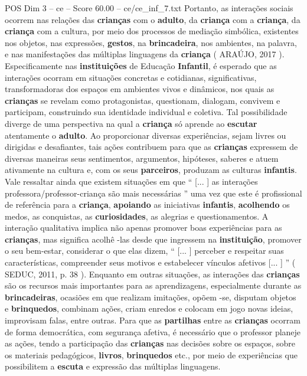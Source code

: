 \begin{textsample}{POS Dim 3 – ce – Score 60.00 – ce/ce\_inf\_7.txt}
Portanto, as interações sociais ocorrem nas relações das \textbf{crianças} com o \textbf{adulto}, da \textbf{criança} com a \textbf{criança}, da \textbf{criança} com a cultura, por meio dos processos de mediação simbólica, existentes nos objetos, nas expressões, \textbf{gestos}, na \textbf{brincadeira}, nos ambientes, na palavra, e nas manifestações das múltiplas linguagens da \textbf{criança} ( ARAÚJO, 2017 ).
Especificamente nas \textbf{instituições} de Educação \textbf{Infantil}, é esperado que as interações ocorram em situações concretas e cotidianas, significativas, transformadoras dos espaços em ambientes vivos e dinâmicos, nos quais as \textbf{crianças} se revelam como protagonistas, questionam, dialogam, convivem e participam, construindo sua identidade individual e coletiva.
Tal possibilidade diverge de uma perspectiva na qual a \textbf{criança} só aprende ao \textbf{escutar} atentamente o \textbf{adulto}.
Ao proporcionar diversas experiências, sejam livres ou dirigidas e desafiantes, tais ações contribuem para que as \textbf{crianças} expressem de diversas maneiras seus sentimentos, argumentos, hipóteses, saberes e atuem ativamente na cultura e, com os seus \textbf{parceiros}, produzam as culturas \textbf{infantis}.
Vale ressaltar ainda que existem situações em que “ [... ] as interações professora/professor-criança são mais necessárias ” uma vez que este é profissional de referência para a \textbf{criança}, \textbf{apoiando} as iniciativas \textbf{infantis}, \textbf{acolhendo} os medos, as conquistas, as \textbf{curiosidades}, as alegrias e questionamentos.
A interação qualitativa implica não apenas promover boas experiências para as \textbf{crianças}, mas significa acolhê -las desde que ingressem na \textbf{instituição}, promover o seu bem-estar, considerar o que elas dizem, “ [... ] perceber e respeitar suas características, compreender seus motivos e estabelecer vínculos afetivos [... ] ” ( SEDUC, 2011, p. 38 ).
Enquanto em outras situações, as interações das \textbf{crianças} são os recursos mais importantes para as aprendizagens, especialmente durante as \textbf{brincadeiras}, ocasiões em que realizam imitações, opõem -se, disputam objetos e \textbf{brinquedos}, combinam ações, criam enredos e colocam em jogo novas ideias, improvisam falas, entre outras.
Para que as \textbf{partilhas} entre as \textbf{crianças} ocorram de forma democrática, com segurança afetiva, é necessário que o professor planeje as ações, tendo a participação das \textbf{crianças} nas decisões sobre os espaços, sobre os materiais pedagógicos, \textbf{livros}, \textbf{brinquedos} etc., por meio de experiências que possibilitem a \textbf{escuta} e expressão das múltiplas linguagens.

\end{textsample}
